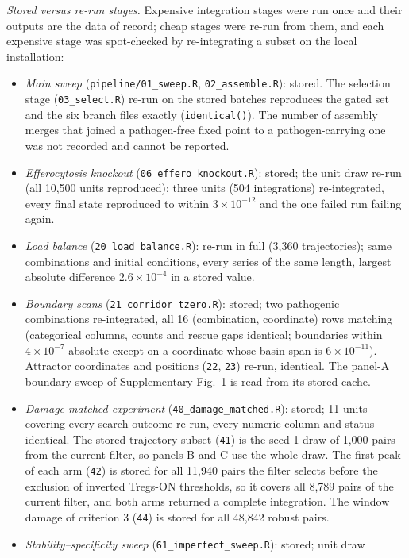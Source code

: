 \documentclass[11pt]{article}
\begin{document}
\emph{Stored versus re-run stages.} Expensive integration stages were run once and their
outputs are the data of record; cheap stages were re-run from them, and each expensive
stage was spot-checked by re-integrating a subset on the local installation:
\begin{itemize}
\item \emph{Main sweep} (\texttt{pipeline/01\_sweep.R}, \texttt{02\_assemble.R}): stored.
  The selection stage (\texttt{03\_select.R}) re-run on the stored batches reproduces the
  gated set and the six branch files exactly (\texttt{identical()}). The number of
  assembly merges that joined a pathogen-free fixed point to a pathogen-carrying one was
  not recorded and cannot be reported.
\item \emph{Efferocytosis knockout} (\texttt{06\_effero\_knockout.R}): stored; the unit
  draw re-run (all 10{,}500 units reproduced); three units (504 integrations) re-integrated,
  every final state reproduced to within $3\times10^{-12}$ and the one failed run failing
  again.
\item \emph{Load balance} (\texttt{20\_load\_balance.R}): re-run in full (3{,}360
  trajectories); same combinations and initial conditions, every series of the same
  length, largest absolute difference $2.6\times10^{-4}$ in a stored value.
\item \emph{Boundary scans} (\texttt{21\_corridor\_tzero.R}): stored; two pathogenic
  combinations re-integrated, all 16 (combination, coordinate) rows matching (categorical
  columns, counts and rescue gaps identical; boundaries within $4\times10^{-7}$ absolute
  except on a coordinate whose basin span is $6\times10^{-11}$). Attractor coordinates
  and positions (\texttt{22}, \texttt{23}) re-run, identical. The panel-A boundary sweep
  of Supplementary Fig.~1 is read from its stored cache.
\item \emph{Damage-matched experiment} (\texttt{40\_damage\_matched.R}): stored; 11 units
  covering every search outcome re-run, every numeric column and status identical. The
  stored trajectory subset (\texttt{41}) is the seed-1 draw of 1{,}000 pairs from the current
  filter, so panels B and C use the whole draw. The first peak
  of each arm (\texttt{42}) is stored for all 11{,}940 pairs the filter selects before the
  exclusion of inverted Tregs-ON thresholds, so it covers all 8{,}789 pairs of the current
  filter, and both arms returned a complete integration. The window damage of criterion 3 (\texttt{44}) is stored for
  all 48{,}842 robust pairs.
\item \emph{Stability--specificity sweep} (\texttt{61\_imperfect\_sweep.R}): stored; unit draw

\end{itemize}
\end{document}
